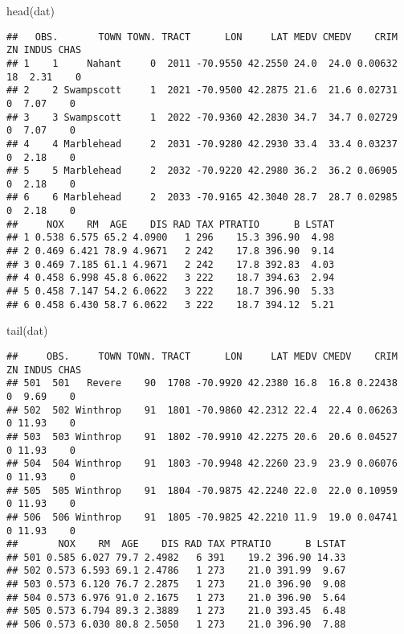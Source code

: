 \documentclass[
]{article}
\newenvironment{Shaded}{\begin{snugshade}}{\end{snugshade}}
\newcommand{\FunctionTok}[1]{\textcolor[rgb]{0.00,0.00,0.00}{#1}}
\newcommand{\NormalTok}[1]{#1}
\begin{document}
\begin{Shaded}
\begin{Highlighting}[]
\FunctionTok{head}\NormalTok{(dat)}
\end{Highlighting}
\end{Shaded}

\begin{verbatim}
##   OBS.       TOWN TOWN. TRACT      LON     LAT MEDV CMEDV    CRIM ZN INDUS CHAS
## 1    1     Nahant     0  2011 -70.9550 42.2550 24.0  24.0 0.00632 18  2.31    0
## 2    2 Swampscott     1  2021 -70.9500 42.2875 21.6  21.6 0.02731  0  7.07    0
## 3    3 Swampscott     1  2022 -70.9360 42.2830 34.7  34.7 0.02729  0  7.07    0
## 4    4 Marblehead     2  2031 -70.9280 42.2930 33.4  33.4 0.03237  0  2.18    0
## 5    5 Marblehead     2  2032 -70.9220 42.2980 36.2  36.2 0.06905  0  2.18    0
## 6    6 Marblehead     2  2033 -70.9165 42.3040 28.7  28.7 0.02985  0  2.18    0
##     NOX    RM  AGE    DIS RAD TAX PTRATIO      B LSTAT
## 1 0.538 6.575 65.2 4.0900   1 296    15.3 396.90  4.98
## 2 0.469 6.421 78.9 4.9671   2 242    17.8 396.90  9.14
## 3 0.469 7.185 61.1 4.9671   2 242    17.8 392.83  4.03
## 4 0.458 6.998 45.8 6.0622   3 222    18.7 394.63  2.94
## 5 0.458 7.147 54.2 6.0622   3 222    18.7 396.90  5.33
## 6 0.458 6.430 58.7 6.0622   3 222    18.7 394.12  5.21
\end{verbatim}

\begin{Shaded}
\begin{Highlighting}[]
\FunctionTok{tail}\NormalTok{(dat)}
\end{Highlighting}
\end{Shaded}

\begin{verbatim}
##     OBS.     TOWN TOWN. TRACT      LON     LAT MEDV CMEDV    CRIM ZN INDUS CHAS
## 501  501   Revere    90  1708 -70.9920 42.2380 16.8  16.8 0.22438  0  9.69    0
## 502  502 Winthrop    91  1801 -70.9860 42.2312 22.4  22.4 0.06263  0 11.93    0
## 503  503 Winthrop    91  1802 -70.9910 42.2275 20.6  20.6 0.04527  0 11.93    0
## 504  504 Winthrop    91  1803 -70.9948 42.2260 23.9  23.9 0.06076  0 11.93    0
## 505  505 Winthrop    91  1804 -70.9875 42.2240 22.0  22.0 0.10959  0 11.93    0
## 506  506 Winthrop    91  1805 -70.9825 42.2210 11.9  19.0 0.04741  0 11.93    0
##       NOX    RM  AGE    DIS RAD TAX PTRATIO      B LSTAT
## 501 0.585 6.027 79.7 2.4982   6 391    19.2 396.90 14.33
## 502 0.573 6.593 69.1 2.4786   1 273    21.0 391.99  9.67
## 503 0.573 6.120 76.7 2.2875   1 273    21.0 396.90  9.08
## 504 0.573 6.976 91.0 2.1675   1 273    21.0 396.90  5.64
## 505 0.573 6.794 89.3 2.3889   1 273    21.0 393.45  6.48
## 506 0.573 6.030 80.8 2.5050   1 273    21.0 396.90  7.88
\end{verbatim}
\end{document}
